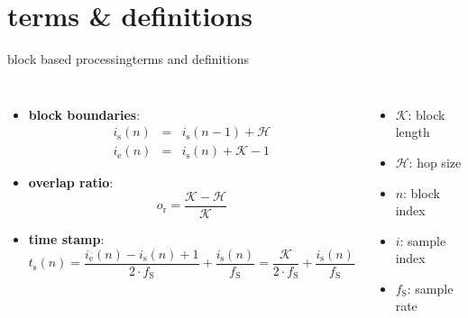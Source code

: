     \section[definitions]{terms \& definitions}
        \begin{frame}{block based processing}{terms and definitions}
            \begin{columns}
                    \begin{itemize}
                        \item   \textbf{block boundaries}:
                            \begin{eqnarray*}
                                i_{\mathrm{s}}(n)	&=& i_{\mathrm{s}}(n-1) + \mathcal{H}\\
                                i_{\mathrm{e}}(n)		&=& i_{\mathrm{s}}(n) + \mathcal{K} - 1
                            \end{eqnarray*}
                        \item   \textbf{overlap ratio}:
                            \begin{equation*}
                                o_{\mathrm{r}}	= \frac {\mathcal{K}-\mathcal{H}}{\mathcal{K}}
                            \end{equation*}
                        \item   \textbf{time stamp}:
                            \begin{equation*}
                                t_{\mathrm{s}}(n) = \frac{i_{\mathrm{e}}(n)-i_{\mathrm{s}}(n)+1}{2\cdot f_{\mathrm{S}}} + \frac{i_{\mathrm{s}}(n)}{f_{\mathrm{S}}} = \frac{\mathcal{K}}{2\cdot f_{\mathrm{S}}} + \frac{i_{\mathrm{s}}(n)}{f_{\mathrm{S}}} 
                            \end{equation*}
                    \end{itemize}
                    \begin{itemize}
                        \item   $\mathcal{K}$: block length
                        \item   $\mathcal{H}$: hop size
                        \item   $n$: block index
                        \item   $i$: sample index
                        \item   $f_\mathrm{S}$: sample rate
                    \end{itemize}
            \end{columns}
        \end{frame}	


